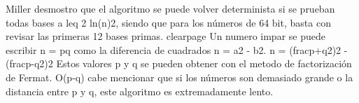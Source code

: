 {}\markdownRendererInterblockSeparator
{}
\markdownRendererSectionEnd \markdownRendererSectionBegin
{}\markdownRendererInterblockSeparator
{}Miller desmostro que el algoritmo se puede volver determinista si se prueban todas bases \markdownRendererDollarSign{}a \markdownRendererBackslash{}leq 2 ln(n)\markdownRendererCircumflex{}2\markdownRendererDollarSign{},\markdownRendererSoftLineBreak
{}siendo que para los números de 64 bit, basta con revisar las primeras 12 bases primas.\markdownRendererParagraphSeparator
{}\markdownRendererInterblockSeparator
{}\markdownRendererDollarSign{}\markdownRendererBackslash{}clearpage\markdownRendererDollarSign{}\markdownRendererInterblockSeparator
{}
\markdownRendererSectionEnd 
\markdownRendererSectionEnd \markdownRendererSectionBegin
{}\markdownRendererParagraphSeparator
{}Un numero impar se puede escribir \markdownRendererDollarSign{}n = pq\markdownRendererDollarSign{} como la diferencia de cuadrados \markdownRendererDollarSign{}n = a\markdownRendererCircumflex{}2 - b\markdownRendererCircumflex{}2\markdownRendererDollarSign{}.\markdownRendererParagraphSeparator
{}\markdownRendererDollarSign{}\markdownRendererDollarSign{}n = (\markdownRendererBackslash{}frac\markdownRendererLeftBrace{}p+q\markdownRendererRightBrace{}\markdownRendererLeftBrace{}2\markdownRendererRightBrace{})\markdownRendererCircumflex{}2 - (\markdownRendererBackslash{}frac\markdownRendererLeftBrace{}p-q\markdownRendererRightBrace{}\markdownRendererLeftBrace{}2\markdownRendererRightBrace{})\markdownRendererCircumflex{}2\markdownRendererDollarSign{}\markdownRendererDollarSign{}\markdownRendererParagraphSeparator
{}Estos valores \markdownRendererDollarSign{}p\markdownRendererDollarSign{} y \markdownRendererDollarSign{}q\markdownRendererDollarSign{} se pueden obtener con el metodo de factorización de Fermat. \markdownRendererDollarSign{}O(\markdownRendererPipe{}p-q\markdownRendererPipe{})\markdownRendererDollarSign{} cabe\markdownRendererSoftLineBreak
{}mencionar que si los números son demasiado grande o la distancia entre \markdownRendererDollarSign{}p\markdownRendererDollarSign{} y \markdownRendererDollarSign{}q\markdownRendererDollarSign{}, este algoritmo es\markdownRendererSoftLineBreak
{}extremadamente lento.\markdownRendererInterblockSeparator
{}\markdownRendererInterblockSeparator
